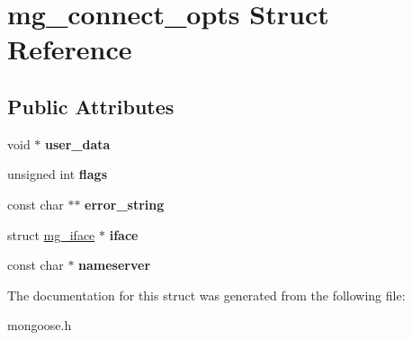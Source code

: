 \hypertarget{structmg__connect__opts}{}\section{mg\+\_\+connect\+\_\+opts Struct Reference}
\label{structmg__connect__opts}
\subsection*{Public Attributes}
\begin{DoxyCompactItemize}
\item 
\mbox{\label{structmg__connect__opts_a88039c409267c457638a0ebce97d7c5c}} 
void $\ast$ {\bfseries user\+\_\+data}
\item 
\mbox{\label{structmg__connect__opts_a794f93a8213aa29cdb59fb42075c0ab0}} 
unsigned int {\bfseries flags}
\item 
\mbox{\label{structmg__connect__opts_a24fa9723e785487ed74b779c1e30ce75}} 
const char $\ast$$\ast$ {\bfseries error\+\_\+string}
\item 
\mbox{\label{structmg__connect__opts_a47c10391acd986fe2ff3f4f308bd1637}} 
struct \hyperlink{structmg__iface}{mg\+\_\+iface} $\ast$ {\bfseries iface}
\item 
\mbox{\label{structmg__connect__opts_a53edbf692c49f5ee86d2fe27ebba816c}} 
const char $\ast$ {\bfseries nameserver}
\end{DoxyCompactItemize}


The documentation for this struct was generated from the following file\+:\begin{DoxyCompactItemize}
\item 
mongoose.\+h\end{DoxyCompactItemize}
